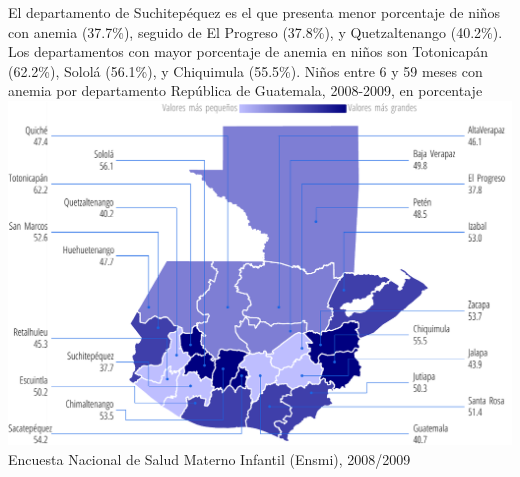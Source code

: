 %
{%
	El departamento de Suchitepéquez es el que presenta menor porcentaje de niños con anemia (37.7\%), seguido de El Progreso (37.8\%), y Quetzaltenango (40.2\%). Los departamentos con mayor porcentaje de anemia en niños son Totonicapán (62.2\%), Sololá (56.1\%), y Chiquimula (55.5\%).
}%
{%
	Niños entre 6 y 59 meses con anemia por departamento} %
{%
	República de Guatemala, 2008-2009, en porcentaje} %
{%
	\includegraphics[width=52\cuadri]{graficas/6_09.pdf}}%
{%
	Encuesta Nacional de Salud Materno Infantil (Ensmi), 2008/2009} %